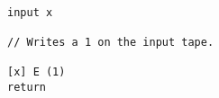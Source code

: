 { \scriptsize \tt
\begin{lstlisting}
input x

// Writes a 1 on the input tape.

[x] E (1)
return
\end{lstlisting}
}
